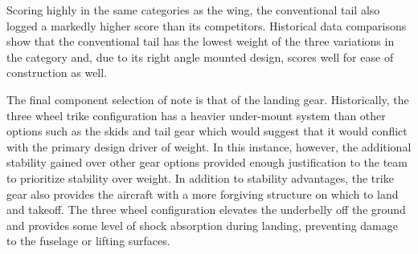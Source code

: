 \documentclass[titlepage]{article}
\begin{document}
\begin{appendices}
Scoring highly in the same categories as the wing, the conventional tail also logged a markedly higher score than its competitors. Historical data comparisons show that the conventional tail has the lowest weight of the three variations in the category and, due to its right angle mounted design, scores well for ease of construction as well.

The final component selection of note is that of the landing gear. Historically, the three wheel trike configuration has a heavier under-mount system than other options such as the skids and tail gear which would suggest that it would conflict with the primary design driver of weight. In this instance, however, the additional stability gained over other gear options provided enough justification to the team to prioritize stability over weight. In addition to stability advantages, the trike gear also provides the aircraft with a more forgiving structure on which to land and takeoff. The three wheel configuration elevates the underbelly off the ground and provides some level of shock absorption during landing, preventing damage to the fuselage or lifting surfaces. 

\begin{table} [h!]
\caption{Control Surface Component Matrix}
\label{tab:control}
\end{table}



\end{appendices}
\end{document}
